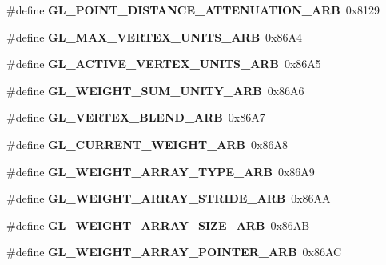 \begin{DoxyCompactItemize}
\item 
\#define {\bfseries G\+L\+\_\+\+P\+O\+I\+N\+T\+\_\+\+D\+I\+S\+T\+A\+N\+C\+E\+\_\+\+A\+T\+T\+E\+N\+U\+A\+T\+I\+O\+N\+\_\+\+A\+R\+B}~0x8129\label{_s_d_l__opengl_8h_a8436c933eb189392754de2518665d94c}

\item 
\#define {\bfseries G\+L\+\_\+\+M\+A\+X\+\_\+\+V\+E\+R\+T\+E\+X\+\_\+\+U\+N\+I\+T\+S\+\_\+\+A\+R\+B}~0x86\+A4\label{_s_d_l__opengl_8h_a9e24ccd85383bb763c2429341d5fa705}

\item 
\#define {\bfseries G\+L\+\_\+\+A\+C\+T\+I\+V\+E\+\_\+\+V\+E\+R\+T\+E\+X\+\_\+\+U\+N\+I\+T\+S\+\_\+\+A\+R\+B}~0x86\+A5\label{_s_d_l__opengl_8h_afe03e7507dba029c5c728e80a9f4e4f6}

\item 
\#define {\bfseries G\+L\+\_\+\+W\+E\+I\+G\+H\+T\+\_\+\+S\+U\+M\+\_\+\+U\+N\+I\+T\+Y\+\_\+\+A\+R\+B}~0x86\+A6\label{_s_d_l__opengl_8h_a766a854ce8b2dfa88b18335c531b39f5}

\item 
\#define {\bfseries G\+L\+\_\+\+V\+E\+R\+T\+E\+X\+\_\+\+B\+L\+E\+N\+D\+\_\+\+A\+R\+B}~0x86\+A7\label{_s_d_l__opengl_8h_a1c2f7d3159c88badaf40fb6cb2a98e98}

\item 
\#define {\bfseries G\+L\+\_\+\+C\+U\+R\+R\+E\+N\+T\+\_\+\+W\+E\+I\+G\+H\+T\+\_\+\+A\+R\+B}~0x86\+A8\label{_s_d_l__opengl_8h_a5d4dbcc01865bfe5799a793886630797}

\item 
\#define {\bfseries G\+L\+\_\+\+W\+E\+I\+G\+H\+T\+\_\+\+A\+R\+R\+A\+Y\+\_\+\+T\+Y\+P\+E\+\_\+\+A\+R\+B}~0x86\+A9\label{_s_d_l__opengl_8h_a095021ade0aecbdaed5db861606fab70}

\item 
\#define {\bfseries G\+L\+\_\+\+W\+E\+I\+G\+H\+T\+\_\+\+A\+R\+R\+A\+Y\+\_\+\+S\+T\+R\+I\+D\+E\+\_\+\+A\+R\+B}~0x86\+A\+A\label{_s_d_l__opengl_8h_a444c6ee1e48470429cd91230d1e6bfb6}

\item 
\#define {\bfseries G\+L\+\_\+\+W\+E\+I\+G\+H\+T\+\_\+\+A\+R\+R\+A\+Y\+\_\+\+S\+I\+Z\+E\+\_\+\+A\+R\+B}~0x86\+A\+B\label{_s_d_l__opengl_8h_a92e50e574f3d23f717e86589f2c74771}

\item 
\#define {\bfseries G\+L\+\_\+\+W\+E\+I\+G\+H\+T\+\_\+\+A\+R\+R\+A\+Y\+\_\+\+P\+O\+I\+N\+T\+E\+R\+\_\+\+A\+R\+B}~0x86\+A\+C\label{_s_d_l__opengl_8h_aebc4e6ec752a7f80a1247aad2ba4c932}


\end{DoxyCompactItemize}
